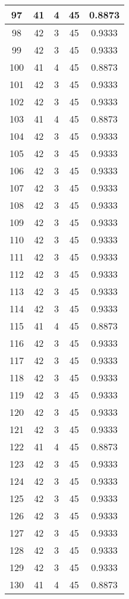 \documentclass[letterpaper, 12pt]{article}
\begin{document}
\begin{longtable}{|c|c|c|c|c|}
\hline
97 & 41 & 4 & 45 & 0.8873 \\
\hline
98 & 42 & 3 & 45 & 0.9333 \\
\hline
99 & 42 & 3 & 45 & 0.9333 \\
\hline
100 & 41 & 4 & 45 & 0.8873 \\
\hline
101 & 42 & 3 & 45 & 0.9333 \\
\hline
102 & 42 & 3 & 45 & 0.9333 \\
\hline
103 & 41 & 4 & 45 & 0.8873 \\
\hline
104 & 42 & 3 & 45 & 0.9333 \\
\hline
105 & 42 & 3 & 45 & 0.9333 \\
\hline
106 & 42 & 3 & 45 & 0.9333 \\
\hline
107 & 42 & 3 & 45 & 0.9333 \\
\hline
108 & 42 & 3 & 45 & 0.9333 \\
\hline
109 & 42 & 3 & 45 & 0.9333 \\
\hline
110 & 42 & 3 & 45 & 0.9333 \\
\hline
111 & 42 & 3 & 45 & 0.9333 \\
\hline
112 & 42 & 3 & 45 & 0.9333 \\
\hline
113 & 42 & 3 & 45 & 0.9333 \\
\hline
114 & 42 & 3 & 45 & 0.9333 \\
\hline
115 & 41 & 4 & 45 & 0.8873 \\
\hline
116 & 42 & 3 & 45 & 0.9333 \\
\hline
117 & 42 & 3 & 45 & 0.9333 \\
\hline
118 & 42 & 3 & 45 & 0.9333 \\
\hline
119 & 42 & 3 & 45 & 0.9333 \\
\hline
120 & 42 & 3 & 45 & 0.9333 \\
\hline
121 & 42 & 3 & 45 & 0.9333 \\
\hline
122 & 41 & 4 & 45 & 0.8873 \\
\hline
123 & 42 & 3 & 45 & 0.9333 \\
\hline
124 & 42 & 3 & 45 & 0.9333 \\
\hline
125 & 42 & 3 & 45 & 0.9333 \\
\hline
126 & 42 & 3 & 45 & 0.9333 \\
\hline
127 & 42 & 3 & 45 & 0.9333 \\
\hline
128 & 42 & 3 & 45 & 0.9333 \\
\hline
129 & 42 & 3 & 45 & 0.9333 \\
\hline
130 & 41 & 4 & 45 & 0.8873 \\

\end{longtable}
\end{document}

